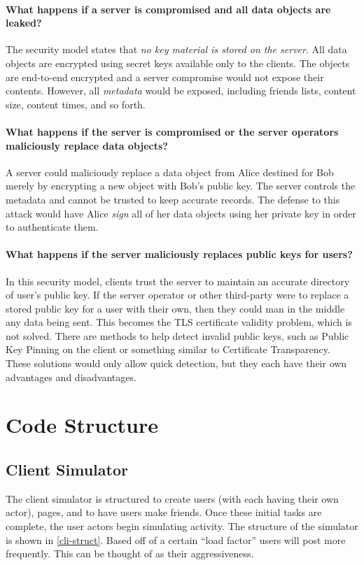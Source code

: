 \documentclass{article}
\begin{document}
\paragraph*{What happens if a server is compromised and all data objects are leaked?} The security model states that \emph{no key material is stored on the server}. All data objects are encrypted using secret keys available only to the clients. The objects are end-to-end encrypted and a server compromise would not expose their contents. However, all \emph{metadata} would be exposed, including friends lists, content size, content times, and so forth.
\paragraph*{What happens if the server is compromised or the server operators maliciously replace data objects?} A server could maliciously replace a data object from Alice destined for Bob merely by encrypting a new object with Bob's public key. The server controls the metadata and cannot be trusted to keep accurate records. The defense to this attack would have Alice \emph{sign} all of her data objects using her private key in order to authenticate them.
\paragraph*{What happens if the server maliciously replaces public keys for users?} In this security model, clients trust the server to maintain an accurate directory of user's public key. If the server operator or other third-party were to replace a stored public key for a user with their own, then they could man in the middle any data being sent. This becomes the TLS certificate validity problem, which is not solved. There are methods to help detect invalid public keys, such as Public Key Pinning on the client or something similar to Certificate Transparency. These solutions would only allow quick detection, but they each have their own advantages and disadvantages.
 
\section*{Code Structure}

\subsection*{Client Simulator}

The client simulator is structured to create users (with each having their own actor), pages, and to have users make friends. Once these initial tasks are complete, the user actors begin simulating activity. The structure of the simulator is shown in \autoref{cli-struct}. Based off of a certain ``load factor'' users will post more frequently. This can be thought of as their aggressiveness.
\end{document}
